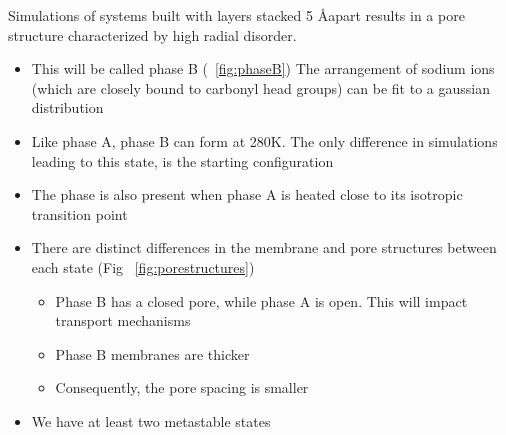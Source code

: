 \documentclass{article}
\begin{document}
	Simulations of systems built with layers stacked 5 \AA apart results in a pore structure characterized by high radial disorder.
	\begin{itemize}
		\item This will be called phase B (~\ref{fig:phaseB})
		\itme The arrangement of sodium ions (which are closely bound to carbonyl head groups) can be fit to a gaussian distribution %
		\item Like phase A, phase B can form at 280K. The only difference in simulations leading to this state, is the starting configuration
		\item The phase is also present when phase A is heated close to its isotropic transition point
		\item There are distinct differences in the membrane and pore structures between each state (Fig ~\ref{fig:porestructures})
		\begin{itemize}
			\item Phase B has a closed pore, while phase A is open. This will impact transport mechanisms
			\item Phase B membranes are thicker
			\item Consequently, the pore spacing is smaller
		\end{itemize}
		\item We have at least two metastable states
	\end{itemize}
\end{document}

